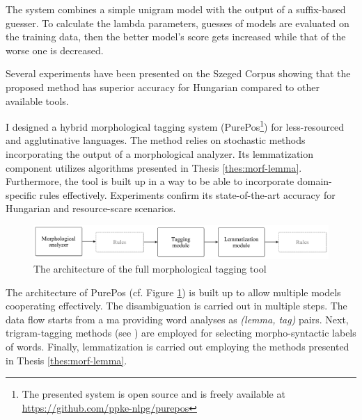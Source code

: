 The system combines a simple unigram model with the output of a suffix-based guesser. 
To calculate the lambda parameters, guesses of models are evaluated on the training data, then the better model's score gets increased while that of the worse one is decreased.

Several experiments have been presented on the Szeged Corpus showing that the proposed method has superior accuracy for Hungarian compared to other available tools. 

\thesisline%


\begin{core}
\begin{thesis}\label{thes:morf-tagging}
I designed a hybrid morphological tagging system (PurePos\footnote{The presented system is open source and is freely available at \href{https://github.com/ppke-nlpg/purepos}{https://github.com/ppke-nlpg/purepos}}) for less-resourced and agglutinative languages.
The method relies on stochastic methods incorporating the output of a morphological analyzer.
Its lemmatization component utilizes algorithms presented in Thesis \ref{thes:morf-lemma}.
Furthermore, the tool is built up in a way to be able to incorporate domain-specific rules effectively.
Experiments confirm its state-of-the-art accuracy for Hungarian and resource-scare scenarios.
\end{thesis}

\begin{pub}
\cite{Orosz2011,Orosz2012,Orosz2012a,Orosz2013a}
\end{pub}
\end{core}

\begin{figure}[ht] 
  \centering
  \includegraphics[width=1\textwidth]{MorphTagging/architecture.png} 
  \caption{The architecture of the full morphological tagging tool}
  \label{fig:purepos-arch_en}
\end{figure}

The architecture of PurePos (cf. Figure \ref{fig:purepos-arch_en}) is built up to allow multiple models cooperating effectively. 
The disambiguation is carried out in multiple steps.
The data flow starts from a \acrshort{ma} providing word analyses as \emph{(lemma, tag)} pairs. 
Next, trigram-tagging methods (see \cite{Brants2000,Halacsy2007}) are employed for selecting morpho-syntactic labels of words. 
Finally, lemmatization is carried out employing the methods presented in Thesis \ref{thes:morf-lemma}. 

